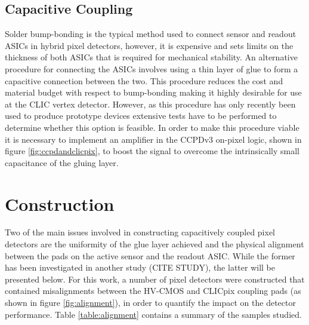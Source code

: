 
\subsection{Capacitive Coupling}

Solder bump-bonding is the typical method used to connect sensor and readout ASICs in hybrid pixel detectors, however, it is expensive and sets limits on the thickness of both ASICs that is required for mechanical stability.  An alternative procedure for connecting the ASICs involves using a thin layer of glue to form a capacitive connection between the two.  This procedure reduces the cost and material budget with respect to bump-bonding making it highly desirable for use at the CLIC vertex detector.  However, as this procedure has only recently been used to produce prototype devices extensive tests have to be performed to determine whether this option is feasible.  In order to make this procedure viable it is necessary to implement an amplifier in the CCPDv3 on-pixel logic, shown in figure \ref{fig:ccpdandclicpix}, to boost the signal to overcome the intrinsically small capacitance of the gluing layer.


\section{Construction}

Two of the main issues involved in constructing capacitively coupled pixel detectors are the uniformity of the glue layer achieved and the physical alignment between the pads on the active sensor and the readout ASIC. While the former has been investigated in another study (CITE STUDY), the latter will be presented below. For this work, a number of pixel detectors were constructed that contained misalignments between the HV-CMOS and CLICpix coupling pads (as shown in figure \ref{fig:alignment}), in order to quantify the impact on the detector performance. Table \ref{table:alignment} contains a summary of the samples studied.

